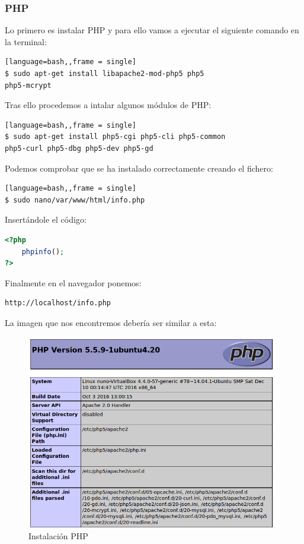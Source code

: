 \subsubsection{PHP}
Lo primero es instalar PHP y para ello vamos a ejecutar el siguiente comando en la terminal:
\begin{lstlisting}[language=bash,,frame = single]
$ sudo apt-get install libapache2-mod-php5 php5 
php5-mcrypt
\end{lstlisting}
Tras ello procedemos a intalar algunos módulos de PHP:
\begin{lstlisting}[language=bash,,frame = single]
$ sudo apt-get install php5-cgi php5-cli php5-common 
php5-curl php5-dbg php5-dev php5-gd
\end{lstlisting}
Podemos comprobar que se ha instalado correctamente creando el fichero:
\begin{lstlisting}[language=bash,,frame = single]
$ sudo nano/var/www/html/info.php
\end{lstlisting}
Insertándole el código:
\begin{lstlisting}[language=PHP,tabsize=4,frame = single,caption=Código para comprobar el funcionamiento de PHP''. ,captionpos=b,label=lst:pruebaPHP]
<?php
	phpinfo();
?>
\end{lstlisting}
Finalmente en el navegador ponemos: 
\begin{lstlisting}[language=html,frame = single]
http://localhost/info.php
\end{lstlisting}
La imagen que nos encontremos debería ser similar a esta:
\begin{figure}
\centering
\includegraphics[width=.9\textwidth]{img/php}
\caption{Instalación PHP}
\label{fig:php}
\end{figure}

